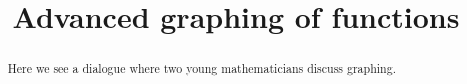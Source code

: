 \documentclass{ximera}
\title[Break-Ground:]{Advanced graphing of functions}
\begin{document}
\begin{abstract}
Here we see a dialogue where two young mathematicians discuss graphing.
\end{abstract}
\maketitle






\end{document}
